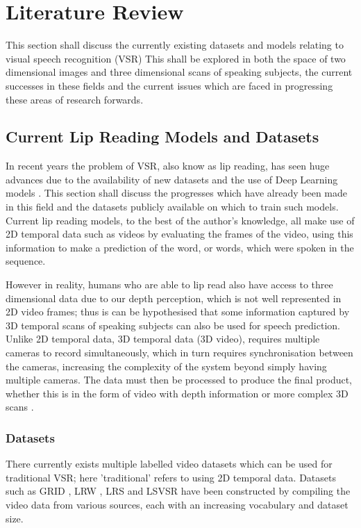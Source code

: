 %
%
%
%
%

\chapter{Literature Review}


This section shall discuss the currently existing datasets and models relating to visual speech recognition (VSR)
This shall be explored in both the space of two dimensional images and three dimensional scans of speaking subjects, the current successes in these fields and the current issues which are faced in progressing these areas of research forwards.

\section{Current Lip Reading Models and Datasets}

In recent years the problem of VSR, also know as lip reading, has seen huge advances due to the availability of new datasets and the use of Deep Learning models \cite{Chung2016, Chung2017, Shillingford2018}.
This section shall discuss the progresses which have already been made in this field and the datasets publicly available on which to train such models.
Current lip reading models, to the best of the author's knowledge, all make use of 2D temporal data such as videos by evaluating the frames of the video, using this information to make a prediction of the word, or words, which were spoken in the sequence.

However in reality, humans who are able to lip read also have access to three dimensional data due to our depth perception, which is not well represented in 2D video frames; thus is can be hypothesised that some information captured by 3D temporal scans of speaking subjects can also be used for speech prediction.
Unlike 2D temporal data, 3D temporal data (3D video), requires multiple cameras to record simultaneously, which in turn requires synchronisation between the cameras, increasing the complexity of the system beyond simply having multiple cameras.
The data must then be processed to produce the final product, whether this is in the form of video with depth information or more complex 3D scans \cite{Li2017}.

\subsection{Datasets}
There currently exists multiple labelled video datasets which can be used for traditional VSR; here 'traditional' refers to using 2D temporal data.
Datasets such as GRID \cite{Cooke2006}, LRW \cite{Chung2016}, LRS \cite{Chung2017} and LSVSR \cite{Shillingford2018} have been constructed by compiling the video data from various sources, each with an increasing vocabulary and dataset size.

